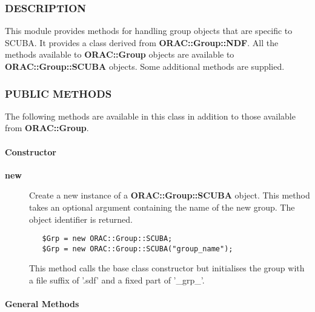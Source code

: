 \begin{description}
\begin{description}
\subsubsection*{DESCRIPTION\label{ORAC::Group::SCUBA_DESCRIPTION}}


This module provides methods for handling group objects that
are specific to SCUBA. It provides a class derived from \textbf{ORAC::Group::NDF}.
All the methods available to \textbf{ORAC::Group} objects are available
to \textbf{ORAC::Group::SCUBA} objects. Some additional methods are supplied.

\subsubsection*{PUBLIC METHODS\label{ORAC::Group::SCUBA_PUBLIC_METHODS}}


The following methods are available in this class in addition to
those available from \textbf{ORAC::Group}.

\paragraph*{Constructor\label{ORAC::Group::SCUBA_Constructor}}
\begin{description}

\item[{\textbf{new}}] \mbox{}

Create a new instance of a \textbf{ORAC::Group::SCUBA} object.
This method takes an optional argument containing the
name of the new group. The object identifier is returned.

\begin{verbatim}
   $Grp = new ORAC::Group::SCUBA;
   $Grp = new ORAC::Group::SCUBA("group_name");
\end{verbatim}


This method calls the base class constructor but initialises
the group with a file suffix of '.sdf' and a fixed part
of '\_grp\_'.

\end{description}
\paragraph*{General Methods\label{ORAC::Group::SCUBA_General_Methods}}
\begin{description}


\end{description}
\end{description}
\end{description}
